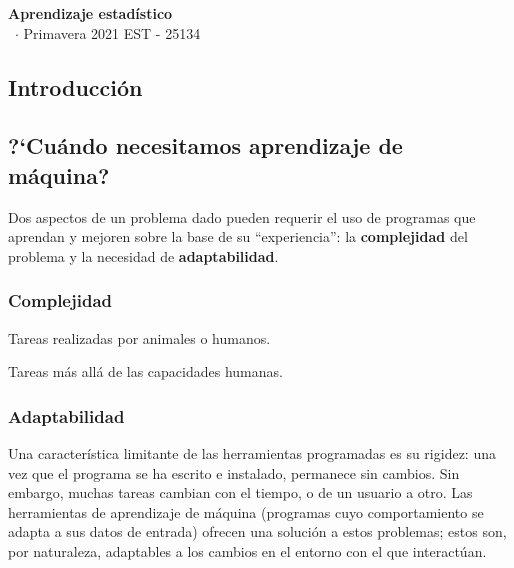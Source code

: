 \documentclass[8pt,a4paper]{extarticle}
\renewcommand{\csClass}{Aprendizaje estadístico}
\renewcommand{\csClassCode}{EST - 25134}
\renewcommand{\csTerm}{Primavera 2021}
\begin{document}
\begin{titlepage}
	\begin{center}
		\vspace*{1cm}
		\Huge
		\textbf{\csClass}
		\vspace{0.5cm} \\
		\Large
		\cs\ $\cdot$ \csTerm
		\vfill
		\csAuthorName
		\vspace{0.8cm}
		\csClassCode\\
		\csSchool
	\end{center}
\end{titlepage}

\begin{multicols}{3}
	\setcounter{page}{1}

	\section*{Introducción}

	\subsection*{?`Cuándo necesitamos aprendizaje de máquina?}

	Dos aspectos de un problema dado pueden requerir el uso de programas que aprendan y mejoren sobre la base de su ``experiencia'': la \textbf{complejidad} del problema y la necesidad de \textbf{adaptabilidad}.

	\subsubsection*{Complejidad}

	\begin{bulletlist}
		\item Tareas realizadas por animales o humanos.
		\item Tareas más allá de las capacidades humanas.
	\end{bulletlist}

	\subsubsection*{Adaptabilidad}

	Una característica limitante de las herramientas programadas es su rigidez: una vez que el programa se ha escrito e instalado, permanece sin cambios. Sin embargo, muchas tareas cambian con el tiempo, o de un usuario a otro. Las herramientas de aprendizaje de máquina (programas cuyo comportamiento se adapta a sus datos de entrada) ofrecen una solución a estos problemas; estos son, por naturaleza, adaptables a los cambios en el entorno con el que interactúan.


\end{multicols}
\end{document}
